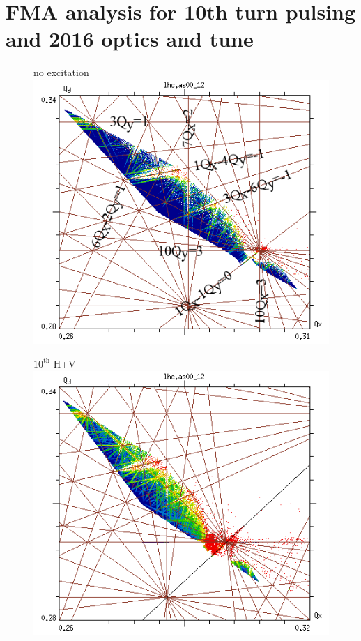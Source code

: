 \documentclass[%
 reprint,
 amsmath,amssymb,
 aps,
prstab,
]{revtex4-1}
\begin{document}
\clearpage

\appendix
\section{FMA analysis for 10th turn pulsing and 2016 optics and tune}
\label{sec:fma:10}
\begin{figure}[h]
	\begin{minipage}[t]{0.49\linewidth}
		\centering
		no excitation
		\includegraphics[width=1.0\linewidth]{2016injnocolc15o+19_6noerru_dp0_ord10_annotate.png}
	\end{minipage}
	\begin{minipage}[t]{0.49\linewidth}
		\centering
		$10^{\mathrm{th}}$ H+V
		\includegraphics[width=1.0\linewidth]{2016injnocolc15o+19_6noerrut10skhv_dp0_ord10.png}

\end{minipage}
\end{figure}
\end{document}

